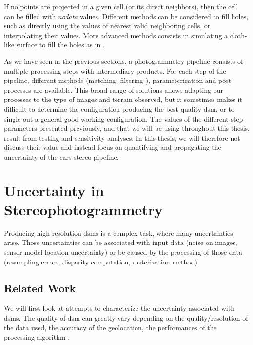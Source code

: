 \begin{remark}
    If no points are projected in a given cell (or its direct neighbors), then the cell can be filled with \textit{nodata} values. Different methods can be considered to fill holes, such as directly using the values of nearest valid neighboring cells, or interpolating their values. More advanced methods consists in simulating a cloth-like surface to fill the holes as in \cite{lallement_bulldozer_2022}.
\end{remark}

As we have seen in the previous sections, a photogrammetry pipeline consists of multiple processing steps with intermediary products. For each step of the pipeline, different methods (\eg matching, filtering \etc), parameterization and post-processes are available. This broad range of solutions allows adapting our processes to the type of images and terrain observed, but it sometimes makes it difficult to determine the configuration producing the best quality \acrshort{dsm}, or to single out a general good-working configuration. The values of the different step parameters presented previously, and that we will be using throughout this thesis, result from testing and sensitivity analyses. In this thesis, we will therefore not discuss their value and instead focus on quantifying and propagating the uncertainty of the \acrshort{cars} stereo pipeline.

\section{Uncertainty in Stereophotogrammetry}\label{sec:previous_work_stereo_uncertainty}
Producing high resolution \acrshort{dsm}s is a complex task, where many uncertainties arise. Those uncertainties can be associated with input data (noise on images, sensor model location uncertainty) or be caused by the processing of those data (resampling errors, disparity computation, rasterization method).

\subsection{Related Work}\label{sec:related_work}
We will first look at attempts to characterize the uncertainty associated with \acrshort{dsm}s. The quality of \acrshort{dsm} can greatly vary depending on the quality/resolution of the data used, the accuracy of the geolocation, the performances of the processing algorithm \etc.

